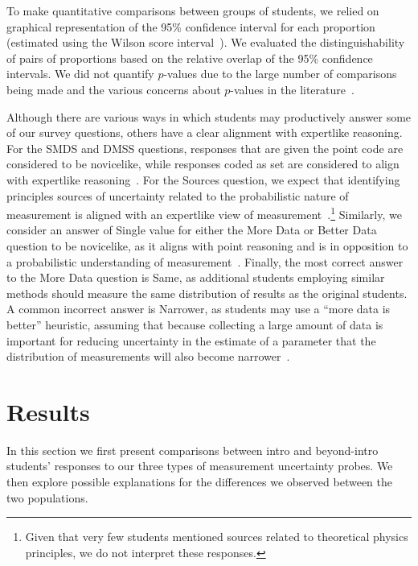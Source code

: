 \documentclass[english,aps,prstper,reprint,showpacs,longbibliography,superscriptaddress,nofootinbib]{revtex4-2}
\begin{document}
To make quantitative comparisons between groups of students, we relied on graphical representation of the 95\% confidence interval for each proportion (estimated using the Wilson score interval~\cite{Wilson1927}). We evaluated the distinguishability of pairs of proportions based on the relative overlap of the 95\% confidence intervals. We did not quantify $p$-values due to the large number of comparisons being made and the various concerns about $p$-values in the literature~\cite[e.g.][]{cohen_earth_1994, cumming_new_2013, nosek_preregistration_2018}. 

Although there are various ways in which students may productively answer some of our survey questions, others have a clear alignment with expertlike reasoning. For the SMDS and DMSS questions, responses that are given the point code are considered to be novicelike, while responses coded as set are considered to align with expertlike reasoning~\cite{Allie1998,Buffler2001,Lubben2001}. For the Sources question, we expect that identifying principles sources of uncertainty related to the probabilistic nature of measurement is aligned with an expertlike view of measurement~\cite{Evangelinos1999,Evangelinos2002,Allie2003,Pillay2008,Buffler2008}.\footnote{Given that very few students mentioned sources related to theoretical physics principles, we do not interpret these responses.} Similarly, we consider an answer of Single value for either the More Data or Better Data question to be novicelike, as it aligns with point reasoning and is in opposition to a probabilistic understanding of measurement~\cite{Allie1998,Buffler2001,Lubben2001}. Finally, the most correct answer to the More Data question is Same, as additional students employing similar methods should measure the same distribution of results as the original students. A common incorrect answer is Narrower, as students may use a ``more data is better'' heuristic, assuming that because collecting a large amount of data is important for reducing uncertainty in the estimate of a parameter that the distribution of measurements will also become narrower~\cite{SchangTBD}.

\section{Results}

In this section we first present comparisons between intro and beyond-intro students' responses to our three types of measurement uncertainty probes. We then explore possible explanations for the differences we observed between the two populations.
\end{document}
